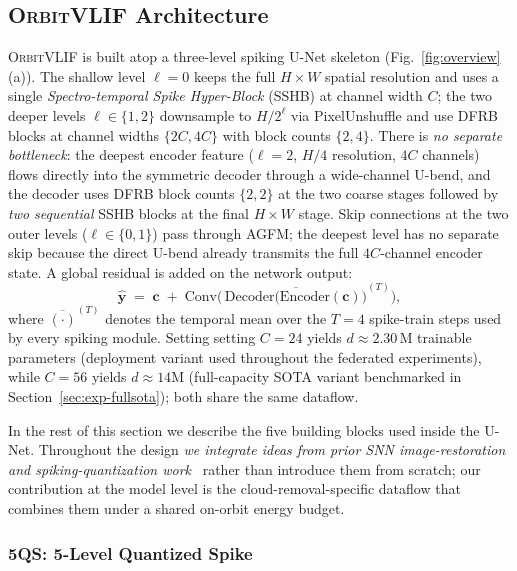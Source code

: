 \documentclass[conference]{IEEEtran}
\newcommand{\OrbitVLIF}{\textsc{OrbitVLIF}}
\newcommand{\DFRB}{\textsc{DFRB}}
\newcommand{\SSHB}{\textsc{SSHB}}
\newcommand{\FQS}{\textsc{5QS}}
\newcommand{\AGFM}{\textsc{AGFM}}
\begin{document}
\subsection{\OrbitVLIF{} Architecture}\label{sec:framework-arch}

\OrbitVLIF{} is built atop a three-level spiking U-Net skeleton
(Fig.~\ref{fig:overview}\,(a)).
The shallow level $\ell\!=\!0$ keeps the full $H\!\times\!W$
spatial resolution and uses a single \emph{Spectro-temporal
Spike Hyper-Block} (\SSHB) at channel width $C$;
the two deeper levels $\ell\!\in\!\{1,2\}$ downsample to
$H/2^{\ell}$ via PixelUnshuffle and use \DFRB{} blocks at channel
widths $\{2C,4C\}$ with block counts $\{2,4\}$.
There is \emph{no separate bottleneck}: the deepest encoder feature
($\ell\!=\!2$, $H/4$ resolution, $4C$ channels) flows directly
into the symmetric decoder through a wide-channel U-bend, and the
decoder uses \DFRB{} block counts $\{2,2\}$ at the two coarse
stages followed by \emph{two sequential} \SSHB{} blocks at the
final $H\!\times\!W$ stage.
Skip connections at the two outer levels ($\ell\!\in\!\{0,1\}$)
pass through \AGFM{}; the deepest level has no separate skip
because the direct U-bend already transmits the full $4C$-channel
encoder state.
A global residual is added on the network output:
\begin{equation}
\hat{\mathbf{y}} \;=\; \mathbf{c} \;+\;
\mathrm{Conv}\!\Big(\,\overline{\mathrm{Decoder}\!\big(\mathrm{Encoder}(\mathbf{c})\big)}^{(T)}\Big),
\label{eq:globalresidual}
\end{equation}
where $\overline{(\cdot)}^{(T)}$ denotes the temporal mean over the
$T\!=\!4$ spike-train steps used by every spiking module. Setting
setting $C\!=\!24$ yields $d \approx 2.30\,$M trainable parameters
(deployment variant used throughout the federated experiments),
while $C\!=\!56$ yields $d \approx 14$M (full-capacity SOTA variant
benchmarked in Section~\ref{sec:exp-fullsota}); both share the
same dataflow.

In the rest of this section we describe the five building blocks
used inside the U-Net.  Throughout the design \emph{we integrate
ideas from prior SNN image-restoration and spiking-quantization
work}~\cite{ref:fsta-snn, ref:esdnet, ref:darkir} rather than
introduce them from scratch; our contribution at the model level
is the cloud-removal-specific dataflow that combines them under a
shared on-orbit energy budget.

\subsubsection{\FQS{}: 5-Level Quantized Spike}\label{sec:framework-5qs}
\end{document}
